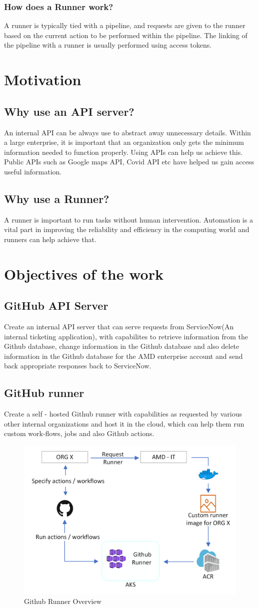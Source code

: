 \subsubsection{How does a Runner work?}
A runner is typically tied with a pipeline, and requests are given to the runner based on the current action to be performed within the pipeline. The linking of the pipeline with a runner is usually performed using access tokens.

\section{Motivation}
\subsection{Why use an API server?}
An internal API can be always use to abstract away unnecessary details. Within a large enterprise, it is important that an organization only gets the minimum information needed to function properly. Using APIs can help us achieve this.
Public APIs such as Google maps API, Covid API etc have helped us gain access useful information.
\subsection{Why use a Runner?}
A runner is important to run tasks without human intervention. Automation is a vital part in improving the reliability and efficiency in the computing world and runners can help achieve that.
\section{Objectives of the work}
\subsection{GitHub API Server}
Create an internal API server that can serve requests from ServiceNow(An internal ticketing application), with capabilites to retrieve information from the Github database, change information in the Github database and also delete information in the Github database for the AMD enterprise account and send back appropriate responses back to ServiceNow.
\subsection{GitHub runner}
Create a self - hosted Github runner with capabilities as requested by various other internal organizations and host it in the cloud, which can help them run custom work-flows, jobs and also Github actions.

\begin{figure}[H]
\centering
\includegraphics[width = .7\linewidth]{Images/RUNNEROVERVIEW}
\caption{Github Runner Overview}
\label{Github Runner Overview}
\end{figure}
